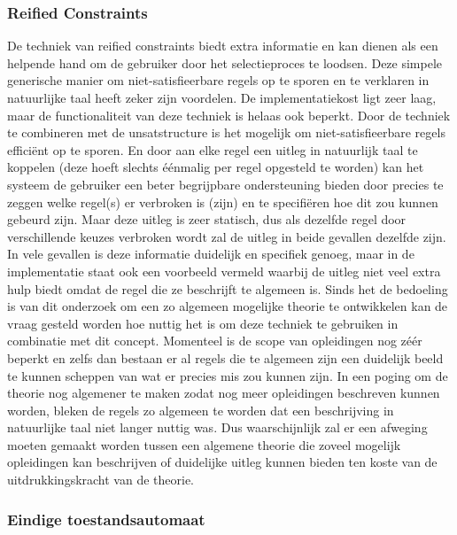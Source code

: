 \subsubsection{Reified Constraints}
De techniek van reified constraints biedt extra informatie en kan dienen als een helpende hand om de gebruiker door het selectieproces te loodsen. Deze simpele generische manier om niet-satisfieerbare regels op te sporen en te verklaren in natuurlijke taal heeft zeker zijn voordelen. De implementatiekost ligt zeer laag, maar de functionaliteit van deze techniek is helaas ook beperkt. Door de techniek te combineren met de unsatstructure is het mogelijk om niet-satisfieerbare regels effici\"{e}nt op te sporen. En door aan elke regel een uitleg in natuurlijk taal te koppelen (deze hoeft slechts \'{e}\'{e}nmalig per regel opgesteld te worden) kan het systeem de gebruiker een beter begrijpbare ondersteuning bieden door precies te zeggen welke regel(s) er verbroken is (zijn) en te specifi\"{e}ren hoe dit zou kunnen gebeurd zijn. Maar deze uitleg is zeer statisch, dus als dezelfde regel door verschillende keuzes verbroken wordt zal de uitleg in beide gevallen dezelfde zijn. In vele gevallen is deze informatie duidelijk en specifiek genoeg, maar in de implementatie staat ook een voorbeeld vermeld waarbij de uitleg niet veel extra hulp biedt omdat de regel die ze beschrijft te algemeen is. Sinds het de bedoeling is van dit onderzoek om een zo algemeen mogelijke theorie te ontwikkelen kan de vraag gesteld worden hoe nuttig het is om deze techniek te gebruiken in combinatie met dit concept. Momenteel is de scope van opleidingen nog z\'{e}\'{e}r beperkt en zelfs dan bestaan er al regels die te algemeen zijn een duidelijk beeld te kunnen scheppen van wat er precies mis zou kunnen zijn. In een poging om de theorie nog algemener te maken zodat nog meer opleidingen beschreven kunnen worden, bleken de regels zo algemeen te worden dat een beschrijving in natuurlijke taal niet langer nuttig was. Dus waarschijnlijk zal er een afweging moeten gemaakt worden tussen een algemene theorie die zoveel mogelijk opleidingen kan beschrijven of duidelijke uitleg kunnen bieden ten koste van de uitdrukkingskracht van de theorie.

\subsubsection{Eindige toestandsautomaat}
